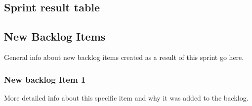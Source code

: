 \subsection{Sprint result table}

\resulttable
{
}

\subsection{New Backlog Items}
General info about new backlog items created as a result of this sprint go here.

\subsubsection{New backlog Item 1}
More detailed info about this specific item and why it was added to the backlog.